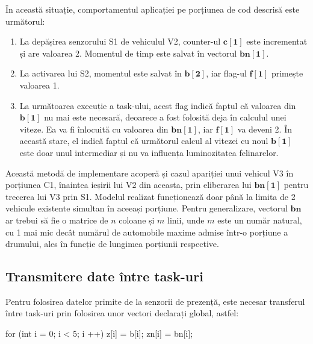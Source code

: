 În această situație, comportamentul aplicației pe porțiunea de cod descrisă este următorul:
\begin{enumerate}
\item  La depășirea senzorului S1 de vehiculul V2, counter-ul $\mathbf{c[1]}$ este incrementat și are valoarea 2. Momentul de timp este salvat în vectorul $\mathbf{bn[1]}$.
\item  La activarea lui S2, momentul este salvat în $\mathbf{b[2]}$, iar flag-ul $\mathbf{f[1]}$ primește valoarea 1.
\item  La următoarea execuție a task-ului, acest flag indică faptul că valoarea din $\mathbf{b[1]}$ nu mai este necesară, deoarece a fost folosită deja în calculul unei viteze. Ea va fi înlocuită cu valoarea din $\mathbf{bn[1]}$, iar $\mathbf{f[1]}$ va deveni 2. În această stare, el indică faptul că următorul calcul al vitezei cu noul $\mathbf{b[1]}$ este doar unul intermediar și nu va influența luminozitatea felinarelor.   

\end{enumerate}

Această metodă de implementare acoperă și cazul apariției unui vehicul V3 în porțiunea C1, înaintea ieșirii lui V2 din aceasta, prin eliberarea lui $\mathbf{bn[1]}$ pentru trecerea lui V3 prin S1. Modelul realizat funcționează doar până la limita de 2 vehicule existente simultan în aceeași porțiune. Pentru generalizare, vectorul $\mathbf{bn}$ ar trebui să fie o matrice de $n$ coloane și $m$ linii, unde $m$ este un număr natural, cu 1 mai mic decât numărul de automobile maxime admise într-o porțiune a drumului, ales în funcție de lungimea porțiunii respective.


\subsection{Transmitere date între task-uri}
 Pentru folosirea datelor primite de la senzorii de prezență, este necesar transferul între task-uri prin folosirea unor vectori declarați global, astfel:

\begin{verbnobox}[\verbarg]
for (int i = 0; i < 5; i ++) { 
      z[i] = b[i];
      zn[i] = bn[i];
    }
\end{verbnobox}



